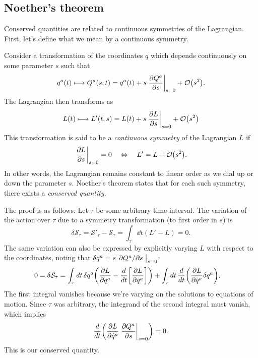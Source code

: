\documentclass{article}
\begin{document}
\subsection{Noether's theorem}
Conserved quantities are related to continuous symmetries of the Lagrangian. First, let's define what we mean by a continuous symmetry.
\par
Consider a transformation of the coordinates $ q $ which depends continuously on some parameter $ s $ such that
\begin{equation}
	q^{a}(t) \longmapsto Q^{a}(s,t) = q^{a}(t) + s \eval{\pdv{Q^{a}}{s}}_{s=0} + \order{s^{2}}.
\end{equation}
The Lagrangian then transforms as
\begin{equation}
	L(t) \longmapsto L'(t, s) = L(t) + s\eval{\pdv{L}{s}}_{s=0} + \order{s^{2}}
\end{equation}
This transformation is said to be a \textit{continuous symmetry} of the Lagrangian $ L $ if
\begin{equation}
	\eval{\pdv{L}{s}}_{s=0} = 0 \equivalent L' = L + \order{s^{2}}.
\end{equation}
In other words, the Lagrangian remains constant to linear order as we dial up or down the parameter $ s $. Noether's theorem states that for each such symmetry, there exists a \textit{conserved quantity}.
\par
The proof is as follows: Let $ \tau $ be some arbitrary time interval. The variation of the action over $ \tau $ due to a symmetry transformation (to first order in $ s $) is
\begin{equation}
	\delta \mathcal{S}_\tau = \mathcal{S}'_\tau - \mathcal{S}_\tau = \int_\tau \dd{t}( L' - L) = 0.
\end{equation}
The same variation can also be expressed by explicitly varying $ L $ with respect to the coordinates, noting that $ \delta q^{a} = s\eval{\pdv*{Q^{a}}{s}}_{s=0} $:
\begin{align}
	\begin{split}
		0 = \delta \mathcal{S}_\tau &= \int_\tau \dd{t} \delta q^{a} \qty(\pdv{L}{q^{a}} - \dv{t}\qty[\pdv{L}{\dot{q}^{a}}]) + \int_\tau \dd{t} \dv{t}(\pdv{L}{\dot{q}^{a}} \delta q^{a}).
	\end{split}
\end{align}
The first integral vanishes because we're varying on the solutions to equations of motion. Since $ \tau $ was arbitrary, the integrand of the second integral must vanish, which implies
\begin{equation}
	\dv{t}(\pdv{L}{\dot{q}^{a}} \eval{\pdv{Q^{a}}{s}}_{s=0}) = 0.
\end{equation}
This is our conserved quantity.
\end{document}
